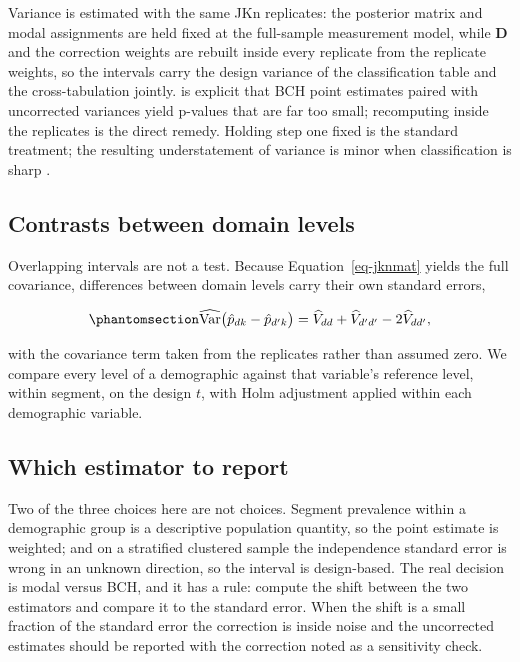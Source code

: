 \documentclass[
  12pt]{article}
\begin{document}
Variance is estimated with the same JKn replicates: the posterior matrix
and modal assignments are held fixed at the full-sample measurement
model, while \(\mathbf{D}\) and the correction weights are rebuilt
inside every replicate from the replicate weights, so the intervals
carry the design variance of the classification table and the
cross-tabulation jointly. \citet{vermunt2010} is explicit that BCH point
estimates paired with uncorrected variances yield p-values that are far
too small; recomputing inside the replicates is the direct remedy.
Holding step one fixed is the standard treatment; the resulting
understatement of variance is minor when classification is sharp
\citep{bakk2014, bakk2013}.

\subsection{Contrasts between domain levels}\label{sec-contrasts}

Overlapping intervals are not a test. Because Equation~\ref{eq-jknmat}
yields the full covariance, differences between domain levels carry
their own standard errors,

\begin{equation}\phantomsection\label{eq-contrast}{
\widehat{\mathrm{Var}}\big(\hat p_{dk} - \hat p_{d'k}\big)
= \widehat V_{dd} + \widehat V_{d'd'} - 2\widehat V_{dd'} ,
}\end{equation}

with the covariance term taken from the replicates rather than assumed
zero. We compare every level of a demographic against that variable's
reference level, within segment, on the design \(t\), with Holm
adjustment \citep{holm1979} applied within each demographic variable.

\subsection{Which estimator to report}\label{sec-whichestimator}

Two of the three choices here are not choices. Segment prevalence within
a demographic group is a descriptive population quantity, so the point
estimate is weighted; and on a stratified clustered sample the
independence standard error is wrong in an unknown direction, so the
interval is design-based. The real decision is modal versus BCH, and it
has a rule: compute the shift between the two estimators and compare it
to the standard error. When the shift is a small fraction of the
standard error the correction is inside noise and the uncorrected
estimates should be reported with the correction noted as a sensitivity
check.
\end{document}
